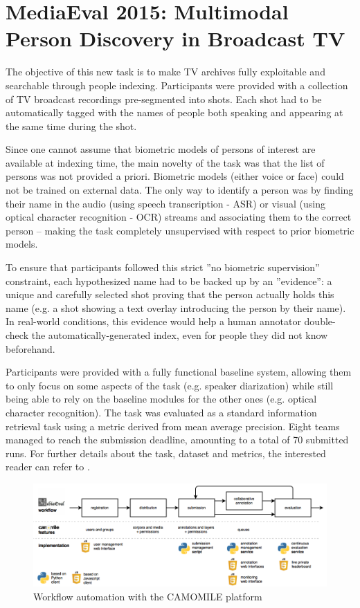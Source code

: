 \documentclass[10pt, a4paper]{article}
\begin{document}
\section{MediaEval 2015: Multimodal Person Discovery in Broadcast TV}

The objective of this new task is to make TV archives fully exploitable and
searchable through people indexing. Participants were provided with a
collection of TV broadcast recordings pre-segmented into shots. Each shot had
to be automatically tagged with the names of people both speaking and appearing
at the same time during the shot.

Since one cannot assume that biometric models of persons of interest are
available at indexing time, the main novelty of the task was that the list of
persons was not provided a priori. Biometric models (either voice or face)
could not be trained on external data. The only way to identify a person was by
finding their name in the audio (using speech transcription - ASR) or visual
(using optical character recognition - OCR) streams and associating them to the
correct person -- making the task completely unsupervised with respect to prior
biometric models.

To ensure that participants followed this strict ''no biometric supervision''
constraint, each hypothesized name had to be backed up by an ''evidence'': a
unique and carefully selected shot proving that the person actually holds this
name (e.g. a shot showing a text overlay introducing the person by their name).
In real-world conditions, this evidence would help a human annotator
double-check the automatically-generated index, even for people they did not
know beforehand.

Participants were provided with a fully functional baseline system, allowing
them to only focus on some aspects of the task (e.g. speaker diarization) while
still being able to rely on the baseline modules for the other ones (e.g.
optical character recognition). The task was evaluated as a standard
information retrieval task using a metric derived from mean average precision.
Eight teams managed to reach the submission deadline, amounting to a total of
70 submitted runs. For further details about the task, dataset and metrics, the
interested reader can refer to \cite{Poignant2015}.


\begin{figure}[htb]
 \center 
 \includegraphics[width=1\linewidth]{figs/workflow.png}
 \centering
 \caption {Workflow automation with the CAMOMILE platform}
 \label{fig:archi}
\end{figure}
\end{document}
